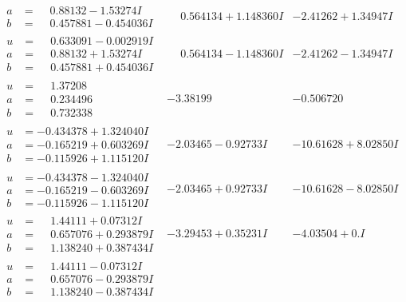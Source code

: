 \documentclass[1p]{elsarticle_modified}
\theoremstyle{definition}
\begin{document}
$$\begin{array}{c|c|c}
\begin{aligned}
a &= \phantom{-}0.88132 - 1.53274 I \\
b &= \phantom{-}0.457881 - 0.454036 I\end{aligned}
 & \phantom{-}0.564134 + 1.148360 I & -2.41262 + 1.34947 I \\ \hline\begin{aligned}
u &= \phantom{-}0.633091 - 0.002919 I \\
a &= \phantom{-}0.88132 + 1.53274 I \\
b &= \phantom{-}0.457881 + 0.454036 I\end{aligned}
 & \phantom{-}0.564134 - 1.148360 I & -2.41262 - 1.34947 I \\ \hline\begin{aligned}
u &= \phantom{-}1.37208\phantom{ +0.000000I} \\
a &= \phantom{-}0.234496\phantom{ +0.000000I} \\
b &= \phantom{-}0.732338\phantom{ +0.000000I}\end{aligned}
 & -3.38199\phantom{ +0.000000I} & -0.506720\phantom{ +0.000000I} \\ \hline\begin{aligned}
u &= -0.434378 + 1.324040 I \\
a &= -0.165219 + 0.603269 I \\
b &= -0.115926 + 1.115120 I\end{aligned}
 & -2.03465 - 0.92733 I & -10.61628 + 8.02850 I \\ \hline\begin{aligned}
u &= -0.434378 - 1.324040 I \\
a &= -0.165219 - 0.603269 I \\
b &= -0.115926 - 1.115120 I\end{aligned}
 & -2.03465 + 0.92733 I & -10.61628 - 8.02850 I \\ \hline\begin{aligned}
u &= \phantom{-}1.44111 + 0.07312 I \\
a &= \phantom{-}0.657076 + 0.293879 I \\
b &= \phantom{-}1.138240 + 0.387434 I\end{aligned}
 & -3.29453 + 0.35231 I & -4.03504 + 0. I\phantom{ +0.000000I} \\ \hline\begin{aligned}
u &= \phantom{-}1.44111 - 0.07312 I \\
a &= \phantom{-}0.657076 - 0.293879 I \\
b &= \phantom{-}1.138240 - 0.387434 I\end{aligned}

\end{array}$$
\end{document}
